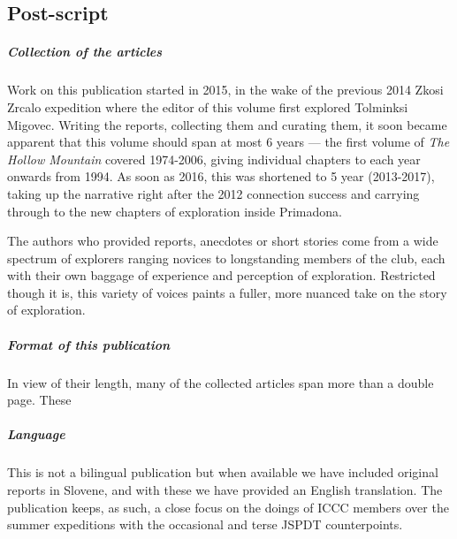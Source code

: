 \newpage
 
 \begin{tcolorbox}
 	\begin{fullwidth}
 	\chapter{Post-script}
 		\begin{multicols}{2}


 			\paragraph{Collection of the articles}

 			Work on this publication started in 2015, in the wake of the previous 2014 Zkosi Zrcalo expedition where the editor of this volume first explored Tolminksi Migovec. Writing the reports, collecting them and curating them, it soon became apparent that this volume should span at most 6 years --- the first volume of \emph{The Hollow Mountain} covered 1974-2006, giving individual chapters to each year onwards from 1994. As soon as 2016, this was shortened to 5 year (2013-2017), taking up the narrative right after the 2012 connection success and carrying through to the new chapters of exploration inside Primadona.


 			The authors who provided reports, anecdotes or short stories come from a wide spectrum of explorers ranging novices to longstanding members of the club, each with their own baggage of experience and perception of exploration. Restricted though it is, this variety of voices paints a fuller, more nuanced take on the story of exploration.

 			\paragraph{Format of this publication}

 			In view of their length, many of the collected articles span more than a double page. These 


 			\paragraph{Language}

 			This is not a bilingual publication but when available we have included original reports in Slovene, and with these we have provided an English translation. The publication keeps, as such, a close focus on the doings of ICCC members over the summer expeditions with the occasional and terse JSPDT counterpoints. 



\end{multicols}
\end{fullwidth}
\end{tcolorbox}
